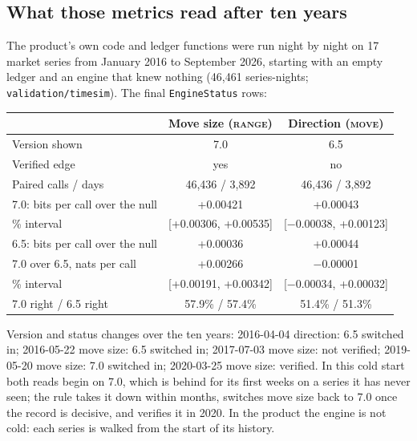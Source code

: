 \documentclass[10.5pt]{article}
\begin{document}
\subsection*{What those metrics read after ten years}
The product's own code and ledger functions were run night by night on 17 market series from January 2016 to September 2026, starting with an empty ledger and an engine that knew nothing (46,461 series-nights; \texttt{validation/timesim}). The final \texttt{EngineStatus} rows:
\begin{center}\begin{tabular}{@{}lcc@{}}\toprule
 & Move size (\textsc{range}) & Direction (\textsc{move})\\\midrule
Version shown & 7.0 & 6.5\\
Verified edge & yes & no\\
Paired calls / days & 46,436 / 3,892 & 46,436 / 3,892\\
7.0: bits per call over the null & +0.00421 & +0.00043\\
\quad 95\% interval & [+0.00306, +0.00535] & [$-$0.00038, +0.00123]\\
6.5: bits per call over the null & +0.00036 & +0.00044\\
7.0 over 6.5, nats per call & +0.00266 & $-$0.00001\\
\quad 95\% interval  & [+0.00191, +0.00342] & [$-$0.00034, +0.00032]\\
7.0 right / 6.5 right & 57.9\% / 57.4\% & 51.4\% / 51.3\%\\
\bottomrule\end{tabular}\end{center}
Version and status changes over the ten years: 2016-04-04 direction: 6.5 switched in; 2016-05-22 move size: 6.5 switched in; 2017-07-03 move size: not verified; 2019-05-20 move size: 7.0 switched in; 2020-03-25 move size: verified. In this cold start both reads begin on 7.0, which is behind for its first weeks on a series it has never seen; the rule takes it down within months, switches move size back to 7.0 once the record is decisive, and verifies it in 2020. In the product the engine is not cold: each series is walked from the start of its history.
\end{document}
